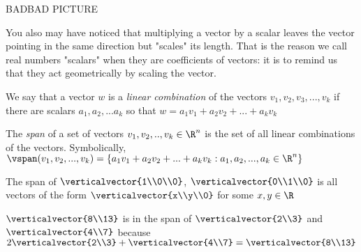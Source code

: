 \documentclass{ximera}
\begin{document}
  		BADBAD PICTURE
  		
  		You also may have noticed that multiplying a vector by a scalar leaves the vector pointing in the same direction but "scales" its length.  That is the reason we call real
  		numbers  "scalars" when they are coefficients of vectors:  it is to remind us that they act geometrically by scaling the vector.
  		
  		\begin{definition}
  			We say that a vector $w$ is a \textit{linear combination} of the vectors $v_1,v_2,v_3,...,v_k$ if there are scalars $a_1,a_2,...a_k$ 
  			so that $w = a_1v_1+a_2v_2+...+a_kv_k$
  		\end{definition}
  		
  		\begin{definition}
  			The \textit{span} of a set of vectors $v_1,v_2, ..,v_k \in \R^n$ is the set of all linear combinations of the vectors.
  			Symbolically, $\vspan(v_1,v_2,...,v_k) = \{ a_1v_1+a_2v_2+...+a_kv_k : a_1,a_2, ...,a_k \in \R^n\}$
  		\end{definition}
  		
  		\begin{example}
  			The span of $\verticalvector{1\\0\\0}$, $\verticalvector{0\\1\\0}$ is all vectors of the form $\verticalvector{x\\y\\0}$ for some $x,y \in \R$
  		\end{example}
  		
  		\begin{example}
  			$\verticalvector{8\\13}$ is in the span of $\verticalvector{2\\3}$ and $\verticalvector{4\\7}$ because
  			 $2\verticalvector{2\\3} + \verticalvector{4\\7} = \verticalvector{8\\13}$ 
  		\end{example}
  		
\end{document}
